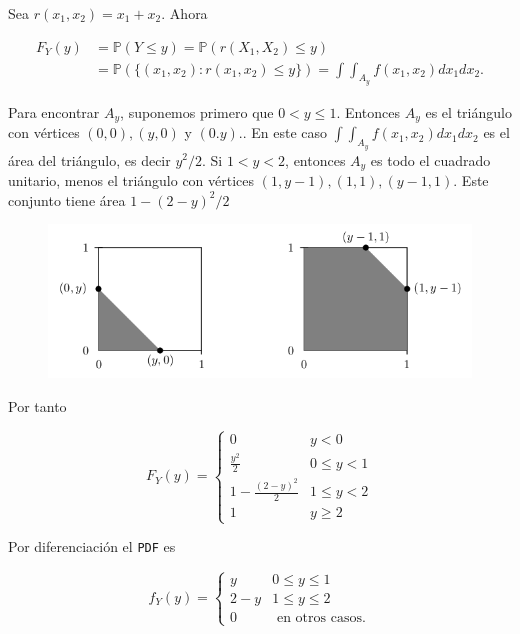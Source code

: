 \documentclass{article}\usepackage[]{graphicx}\usepackage[]{color}
\begin{document}
\vspace{0.3cm}

Sea $r(x_1, x_2) = x_1 + x_2$. Ahora

\vspace{0.3cm}

\begin{align*}
F_{Y}(y) &= \mathbb{P}(Y \leq y)= \mathbb{P}(r(X_1,X_2) \leq y)\\
& = \mathbb{P}( \{(x_1, x_2): r(x_1, x_2)\leq y \}) = \int \int_{A_y}f(x_1, x_2)dx_1dx_2.
\end{align*}

\vspace{0.2cm}

Para encontrar $A_y$, suponemos primero que $0 < y \leq 1$. Entonces $A_y$ es el tri\'angulo con v\'ertices $(0,0), (y,0)$ y $(0.y)$.. En este caso $\int \int_{A_y}f(x_1, x_2)dx_1dx_2$ es el \'area del tri\'angulo, es decir $y^2/2$. Si $1 < y < 2$, entonces $A_y$ es todo el cuadrado unitario, menos el tri\'angulo con v\'ertices $(1, y-1),(1,1), (y -1,1)$. Este conjunto tiene \'area $1 - (2 -y)^2/2$ 

\vspace{0.2cm}

\begin{figure}[h]
\centering
\includegraphics[scale=.65]{graff1-vw.png}
\end{figure}

\vspace{0.2cm}

Por tanto

\vspace{0.2cm}

\[
F_{Y}(y) = \begin{cases}
0 & y < 0\\
\frac{y^2}{2} & 0 \leq y < 1 \\
1 -\frac{(2 -y)^2}{2} & 1 \leq y < 2\\
1 & y \geq 2
\end{cases}
\]

\vspace{0.2cm}

Por diferenciaci\'on el \texttt{PDF} es

\[
f_{Y}(y)=\begin{cases}
y & 0 \leq y \leq 1 \\
2 -y & 1\leq y \leq 2\\
0 & \mbox{ en otros casos}.
\end{cases}
\]
 
\end{document}
